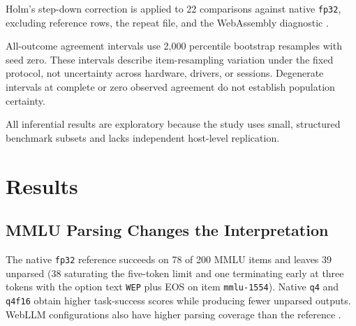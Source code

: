 \documentclass[conference]{IEEEtran}
\newcommand{\fp}{\texttt{fp32}}
\newcommand{\qfour}{\texttt{q4}}
\newcommand{\qfourhalf}{\texttt{q4f16}}
\begin{document}
Holm's step-down correction is applied to 22 comparisons
against native \fp{}, excluding reference rows, the repeat
file, and the WebAssembly diagnostic
\cite{holm,repository}.

All-outcome agreement intervals use 2,000 percentile
bootstrap resamples with seed zero. These intervals describe
item-resampling variation under the fixed protocol,
not uncertainty across hardware, drivers, or sessions.
Degenerate intervals at complete or zero observed agreement
do not establish population certainty.

All inferential results are exploratory because the study
uses small, structured benchmark subsets and lacks
independent host-level replication.


\section{Results}
\label{sec:results}

\subsection{MMLU Parsing Changes the Interpretation}
\label{sec:mmluparsing}

The native \fp{} reference succeeds on 78 of 200 MMLU items
and leaves 39 unparsed (38 saturating the five-token limit
and one terminating early at three tokens with the option text
\texttt{WEP} plus EOS on item \texttt{mmlu-1554}). Native
\qfour{} and \qfourhalf{} obtain higher task-success scores
while producing fewer unparsed outputs. WebLLM configurations
also have higher parsing coverage than the reference
\cite{repository}.
\end{document}

